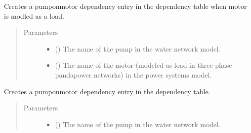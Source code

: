 \documentclass[letterpaper,10pt,english]{sphinxmanual}
\begin{document}
\begin{fulllineitems}
\begin{fulllineitems}
\label{\detokenize{apidoc:dreaminsg_integrated_model.src.network_sim_models.interdependencies.DependencyTable.add_pump_loadmotor_coupling}}
\sphinxAtStartPar
Creates a pump\sphinxhyphen{}on\sphinxhyphen{}motor dependency entry in the dependency table when motor is modled as a load.
\begin{quote}\begin{description}
\item[{Parameters}] \leavevmode\begin{itemize}
\item {} 
\sphinxAtStartPar
{} () \textendash{} The name of the pump in the water network model.

\item {} 
\sphinxAtStartPar
{} () \textendash{} The name of the motor (modeled as load in three phase pandapower networks) in the power systems model.

\end{itemize}

\end{description}\end{quote}

\end{fulllineitems}


\begin{fulllineitems}
\label{\detokenize{apidoc:dreaminsg_integrated_model.src.network_sim_models.interdependencies.DependencyTable.add_pump_motor_coupling}}
\sphinxAtStartPar
Creates a pump\sphinxhyphen{}on\sphinxhyphen{}motor dependency entry in the dependency table.
\begin{quote}\begin{description}
\item[{Parameters}] \leavevmode\begin{itemize}
\item {} 
\sphinxAtStartPar
{} () \textendash{} The name of the pump in the water network model.


\end{itemize}
\end{description}
\end{quote}
\end{fulllineitems}
\end{fulllineitems}
\end{document}
